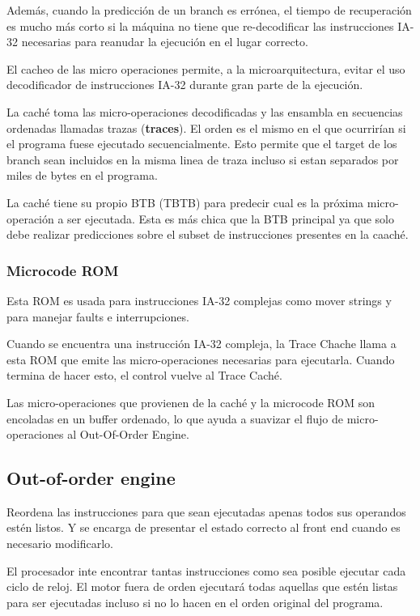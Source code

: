 Además, cuando la predicción de un branch es errónea, el tiempo de recuperación es mucho más corto si la máquina no tiene que re-decodificar las instrucciones IA-32 necesarias para reanudar la ejecución en el lugar correcto.
	
El cacheo de las micro operaciones permite, a la microarquitectura, evitar el uso decodificador de instrucciones IA-32 durante gran parte de la ejecución.
	
La caché toma las micro-operaciones decodificadas y las ensambla en secuencias ordenadas llamadas trazas (\textbf{traces}). El orden es el mismo en el que ocurrirían si el programa fuese ejecutado secuencialmente. Esto permite que el target de los branch sean incluidos en la misma linea de traza incluso si estan separados por miles de bytes en el programa.

La caché tiene su propio BTB (TBTB) para predecir cual es la próxima micro-operación a ser ejecutada. Esta es más chica que la BTB principal ya que solo debe realizar predicciones sobre el subset de instrucciones presentes en la caaché.
\subsubsection*{Microcode ROM}
Esta ROM es usada para instrucciones IA-32 complejas como mover strings y para manejar faults e interrupciones.

Cuando se encuentra una instrucción IA-32 compleja, la Trace Chache llama a esta ROM que emite las micro-operaciones necesarias para ejecutarla. Cuando termina de hacer esto, el control vuelve al Trace Caché.

Las micro-operaciones que provienen de la caché y la microcode ROM son encoladas en un buffer ordenado, lo que ayuda a suavizar el flujo de micro-operaciones al Out-Of-Order Engine.

\subsection{Out-of-order engine}
Reordena las instrucciones para que sean ejecutadas apenas todos sus operandos estén listos. Y se encarga de presentar el estado correcto al front end cuando es necesario modificarlo.

El procesador inte encontrar tantas instrucciones como sea posible ejecutar cada ciclo de reloj. El motor fuera de orden ejecutará todas aquellas que estén listas para ser ejecutadas incluso si no lo hacen en el orden original del programa.

